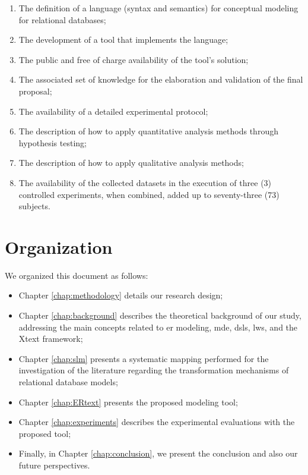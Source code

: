 \begin{enumerate} [label=\roman*.]
    \item The definition of a language (syntax and semantics) for conceptual modeling for relational databases;
    \item The development of a tool that implements the language;
    \item The public and free of charge availability of the tool's solution;
    \item The associated set of knowledge for the elaboration and validation of the final proposal;
    \item The availability of a detailed experimental protocol;
    \item The description of how to apply quantitative analysis methods through hypothesis testing;
    \item The description of how to apply qualitative analysis methods;
    \item The availability of the collected datasets in the execution of three (3) controlled experiments, when combined, added up to seventy-three (73) subjects.
\end{enumerate}

\section{Organization}

We organized this document as follows:

\begin{itemize}
    \item Chapter \ref{chap:methodology} details our research design;
    \item Chapter \ref{chap:background} describes the theoretical background of our study, addressing the main concepts related to \ac{er} modeling, \ac{mde}, \acp{dsl}, \acp{lw}, and the Xtext framework;
    \item Chapter \ref{chap:slm} presents a systematic mapping performed for the investigation of the literature regarding the transformation mechanisms of relational database models;
    \item Chapter \ref{chap:ERtext} presents the proposed modeling tool;
    \item Chapter \ref{chap:experiments} describes the experimental evaluations with the proposed tool;
    \item Finally, in Chapter \ref{chap:conclusion}, we present the conclusion and also our future perspectives.
\end{itemize}



